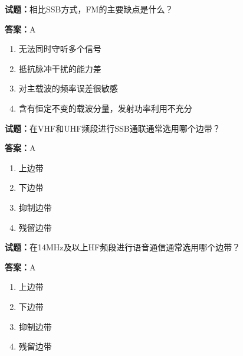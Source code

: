 \documentclass{ctexbook}
\begin{document}


\vspace{1em}

\textbf{试题：}相比SSB方式，FM的主要缺点是什么？ 

\textbf{答案：}A 

\begin{enumerate}[leftmargin=3em]
  \item 无法同时守听多个信号 

  \item 抵抗脉冲干扰的能力差 

  \item 对主载波的频率误差很敏感 

  \item 含有恒定不变的载波分量，发射功率利用不充分 

\end{enumerate}





\vspace{1em}

\textbf{试题：}在VHF和UHF频段进行SSB通联通常选用哪个边带？ 

\textbf{答案：}A 

\begin{enumerate}[leftmargin=3em]
  \item 上边带 

  \item 下边带 

  \item 抑制边带 

  \item 残留边带 

\end{enumerate}





\vspace{1em}

\textbf{试题：}在14MHz及以上HF频段进行语音通信通常选用哪个边带？ 

\textbf{答案：}A 

\begin{enumerate}[leftmargin=3em]
  \item 上边带 

  \item 下边带 

  \item 抑制边带 

  \item 残留边带 

\end{enumerate}
\end{document}
